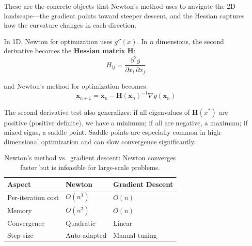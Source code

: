 These are the concrete objects that Newton's method uses to navigate the 2D landscape---the gradient points toward steeper descent, and the Hessian captures how the curvature changes in each direction.

 In 1D, Newton for optimization uses $g''(x)$. In $n$ dimensions, the second derivative becomes the \textbf{Hessian matrix} $\mathbf{H}$:
\begin{equation}
    H_{ij} = \frac{\partial^2 g}{\partial x_i \, \partial x_j}
\end{equation}

and Newton's method for optimization becomes:
\begin{equation}
    \mathbf{x}_{n+1} = \mathbf{x}_n - \mathbf{H}(\mathbf{x}_n)^{-1} \nabla g(\mathbf{x}_n)
\end{equation}


The second derivative test also generalizes: if all eigenvalues of $\mathbf{H}(x^*)$ are positive (positive definite), we have a minimum; if all are negative, a maximum; if mixed signs, a saddle point. Saddle points are especially common in high-dimensional optimization and can slow convergence significantly.

\vspace{1em}

\begin{table}[ht]
\centering
\begin{tabular}{p{}p{}p{}}
\toprule
\textbf{Aspect} & \textbf{Newton} & \textbf{Gradient Descent} \\
\midrule
Per-iteration cost & $O(n^3)$ & $O(n)$ \\
Memory & $O(n^2)$ & $O(n)$ \\
Convergence & Quadratic & Linear \\
Step size & Auto-adapted & Manual tuning \\
\bottomrule
\end{tabular}
\vspace{2em}
\caption{Newton's method vs.\ gradient descent: Newton converges faster but is infeasible for large-scale problems.}
\label{tab:newton_vs_gd}
\end{table}

